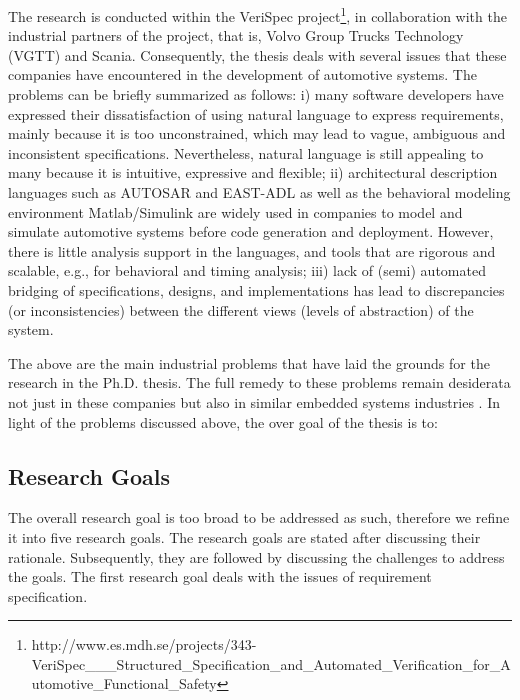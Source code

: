 The research is conducted within the VeriSpec project\footnote{http://www.es.mdh.se/projects/343-VeriSpec\_\_\_Structured\_Specification\_and\_Automated\_Verification\_for\_Automotive\_Functional\_Safety}, in collaboration with the industrial partners of the project, that is, Volvo Group Trucks Technology (VGTT) and Scania. Consequently, the thesis deals with several issues that these companies have encountered in the development of automotive systems. The problems can be briefly summarized as follows: i) many software developers have expressed their dissatisfaction of using natural language to express requirements, mainly because it is too unconstrained, which may lead to vague, ambiguous and inconsistent specifications. Nevertheless, natural language is still appealing to many because it is intuitive, expressive and flexible; ii) architectural description languages such as AUTOSAR and EAST-ADL as well as the behavioral modeling environment Matlab/Simulink are widely used in companies to model and simulate automotive systems before code generation and deployment. However, there is little analysis support in the languages, and tools that are rigorous and scalable, e.g., for behavioral and timing analysis; iii) lack of (semi) automated bridging of specifications, designs, and implementations has lead to discrepancies (or inconsistencies)  between the different views (levels of abstraction) of the system. 

The above are the main industrial problems that have laid the grounds for the research in the Ph.D. thesis. The full remedy to these problems remain desiderata not just in these companies but also in similar embedded systems industries \cite{Laplante2017RequirementsEdition,Martins2017RequirementsChallenges,Grimm2003SoftwareChallenges,Braun2014GuidingApproach,Lee2011IntroductionApproach}. In light of the problems discussed above, the over goal of the thesis is to:

\begin{researchgoal}
\end{researchgoal}

\subsection{Research Goals}\label{research_challenges}
The overall research goal is too broad to be addressed as such, therefore we refine it into five research goals. The research goals are stated after discussing their rationale. Subsequently, they are followed by discussing the challenges to address the goals. The first research goal deals with the issues of requirement specification. 

